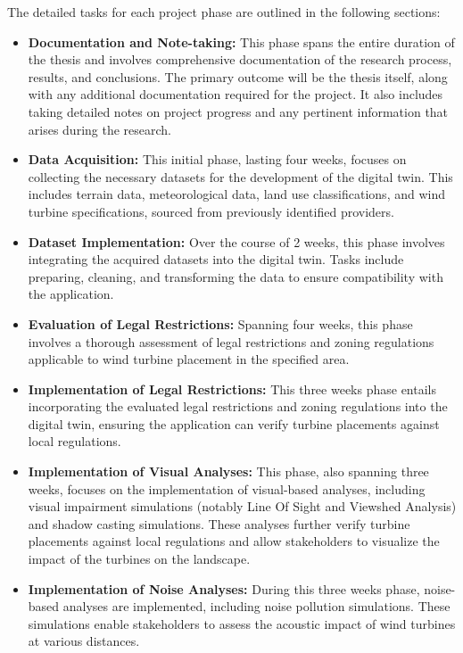 \documentclass[11pt, titlepage, a4paper]{scrartcl}
\begin{document}
\begin{linenumbers}
    The detailed tasks for each project phase are outlined in the following sections:

    \begin{itemize}
        \item \textbf{Documentation and Note-taking:} This phase spans the entire duration of the thesis and involves comprehensive documentation of the research process, results, and conclusions. The primary outcome will be the thesis itself, along with any additional documentation required for the project. It also includes taking detailed notes on project progress and any pertinent information that arises during the research.
        \item \textbf{Data Acquisition:} This initial phase, lasting four weeks, focuses on collecting the necessary datasets for the development of the digital twin. This includes terrain data, meteorological data, land use classifications, and wind turbine specifications, sourced from previously identified providers.
        \item \textbf{Dataset Implementation:} Over the course of 2 weeks, this phase involves integrating the acquired datasets into the digital twin. Tasks include preparing, cleaning, and transforming the data to ensure compatibility with the application.
        \item \textbf{Evaluation of Legal Restrictions:} Spanning four weeks, this phase involves a thorough assessment of legal restrictions and zoning regulations applicable to wind turbine placement in the specified area.
        \item \textbf{Implementation of Legal Restrictions:} This three weeks phase entails incorporating the evaluated legal restrictions and zoning regulations into the digital twin, ensuring the application can verify turbine placements against local regulations.
        \item \textbf{Implementation of Visual Analyses:} This phase, also spanning three weeks, focuses on the implementation of visual-based analyses, including visual impairment simulations (notably Line Of Sight and Viewshed Analysis) and shadow casting simulations. These analyses further verify turbine placements against local regulations and allow stakeholders to visualize the impact of the turbines on the landscape.
        \item \textbf{Implementation of Noise Analyses:} During this three weeks phase, noise-based analyses are implemented, including noise pollution simulations. These simulations enable stakeholders to assess the acoustic impact of wind turbines at various distances.

\end{itemize}
\end{linenumbers}
\end{document}
